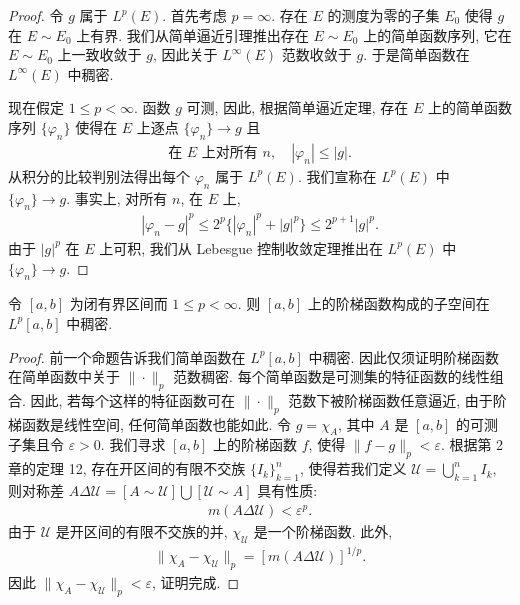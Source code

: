 \documentclass[../../main.tex]{subfiles}
\begin{document}
\begin{proof}
令 $g$ 属于 $L^{p}(E)$. 首先考虑 $p=\infty$. 存在 $E$ 的测度为零的子集 $E_{0}$ 使得 $g$ 在 $E\sim E_{0}$ 上有界. 我们从简单逼近引理推出存在 $E\sim E_{0}$ 上的简单函数序列, 它在 $E\sim E_{0}$ 上一致收敛于 $g$, 因此关于 $L^{\infty}(E)$ 范数收敛于 $g$. 于是简单函数在 $L^{\infty}(E)$ 中稠密.

现在假定 $1\leqslant p<\infty$. 函数 $g$ 可测, 因此, 根据简单逼近定理, 存在 $E$ 上的简单函数序列 $\{\varphi_{n}\}$ 使得在 $E$ 上逐点 $\{\varphi_{n}\}\to g$ 且
\begin{align*}
\text{在 }E\text{ 上对所有 }n,\quad|\varphi_{n}|\leqslant|g|.
\end{align*}
从积分的比较判别法得出每个 $\varphi_{n}$ 属于 $L^{p}(E)$. 我们宣称在 $L^{p}(E)$ 中 $\{\varphi_{n}\}\to g$. 事实上, 对所有 $n$, 在 $E$ 上,
\begin{align*}
|\varphi_{n}-g|^{p}\leqslant 2^{p}\{|\varphi_{n}|^{p}+|g|^{p}\}\leqslant 2^{p+1}|g|^{p}.
\end{align*}
由于 $|g|^{p}$ 在 $E$ 上可积, 我们从 Lebesgue 控制收敛定理推出在 $L^{p}(E)$ 中 $\{\varphi_{n}\}\to g$.
\end{proof}

\begin{proposition}\label{proposition:ch07-阶梯函数稠密}
令 $[a,b]$ 为闭有界区间而 $1\leqslant p<\infty$. 则 $[a,b]$ 上的阶梯函数构成的子空间在 $L^{p}[a,b]$ 中稠密.
\end{proposition}

\begin{proof}
前一个命题告诉我们简单函数在 $L^{p}[a,b]$ 中稠密. 因此仅须证明阶梯函数在简单函数中关于 $\|\cdot\|_{p}$ 范数稠密. 每个简单函数是可测集的特征函数的线性组合. 因此, 若每个这样的特征函数可在 $\|\cdot\|_{p}$ 范数下被阶梯函数任意逼近, 由于阶梯函数是线性空间, 任何简单函数也能如此. 令 $g=\chi_{A}$, 其中 $A$ 是 $[a,b]$ 的可测子集且令 $\varepsilon>0$. 我们寻求 $[a,b]$ 上的阶梯函数 $f$, 使得 $\|f-g\|_{p}<\varepsilon$. 根据第 2 章的定理 12, 存在开区间的有限不交族 $\{I_{k}\}_{k=1}^{n}$, 使得若我们定义 $\mathcal{U}=\bigcup_{k=1}^{n}I_{k}$, 则对称差 $A\Delta\mathcal{U}=[A\sim\mathcal{U}]\bigcup[\mathcal{U}\sim A]$ 具有性质:
\begin{align*}
m(A\Delta\mathcal{U})<\varepsilon^{p}.
\end{align*}
由于 $\mathcal{U}$ 是开区间的有限不交族的并, $\chi_{\mathcal{U}}$ 是一个阶梯函数. 此外,
\begin{align}
\|\chi_{A}-\chi_{\mathcal{U}}\|_{p}=[m(A\Delta\mathcal{U})]^{1/p}.\label{align:ch07-特征函数逼近}
\end{align}
因此 $\|\chi_{A}-\chi_{\mathcal{U}}\|_{p}<\varepsilon$, 证明完成.
\end{proof}
\end{document}
